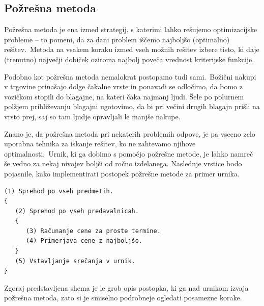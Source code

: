 \documentclass[a4paper,10pt]{article}
\begin{document}
\subsection{Požrešna metoda}

Požrešna metoda je ena izmed strategij, s katerimi lahko rešujemo optimizacijske probleme --
to pomeni, da za dani problem iščemo najboljšo (optimalno) rešitev.\ Metoda na vsakem koraku
izmed vseh možnih rešitev izbere  tisto, ki daje (trenutno) največji dobiček oziroma najbolj
poveča vrednost kriterijske funkcije.

Podobno kot požrešna metoda nemalokrat postopamo tudi sami.\ Božični nakupi v trgovine
prinašajo dolge čakalne vrste in ponavadi se odločimo, da bomo z vozičkom stopili do blagajne,
na kateri čaka najmanj ljudi. Šele po polurnem polžjem približevanju blagajni ugotovimo,
da bi pri večini drugih blagajn prišli na vrsto prej, saj so tam ljudje opravljali le
manjše nakupe.

Znano je, da požrešna metoda pri nekaterih problemih odpove, je pa vseeno zelo uporabna
tehnika za iskanje rešitev, ko ne zahtevamo njihove optimalnosti.\ Urnik, ki ga dobimo s
pomočjo požrešne metode, je lahko namreč še vedno za nekaj nivojev boljši od ročno izdelanega.
Naslednje vrstice bodo pojasnile, kako implementirati postopek požrešne metode za primer urnika.

\begin{verbatim}
(1) Sprehod po vseh predmetih.
{
   (2) Sprehod po vseh predavalnicah.
   {
      (3) Računanje cene za proste termine.
      (4) Primerjava cene z najboljšo.
   }
   (5) Vstavljanje srečanja v urnik.
}
\end{verbatim}

Zgoraj predstavljena shema je le grob opis postopka, ki ga nad urnikom izvaja požrešna metoda,
zato si je smiselno podrobneje ogledati posamezne korake.
\end{document}
